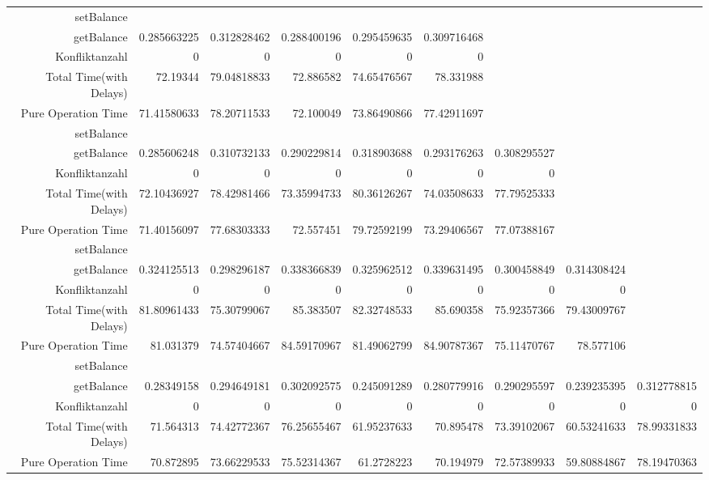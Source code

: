 \begin{landscape}
\begin{table}[htbp]
\begin{tabular}{rrrrrrrrr}
\cline{1-9}    
    setBalance &       &       &       &       &       &       &       &  \\
    getBalance & 0.285663225 & 0.312828462 & 0.288400196 & 0.295459635 & 0.309716468 &       &       &  \\
    Konfliktanzahl & 0     & 0     & 0     & 0     & 0     &       &       &  \\
    Total Time(with Delays) & 72.19344 & 79.04818833 & 72.886582 & 74.65476567 & 78.331988 &       &       &  \\
    Pure Operation Time & 71.41580633 & 78.20711533 & 72.100049 & 73.86490866 & 77.42911697 &       &       &  \\
\cline{1-9}    
    setBalance &       &       &       &       &       &       &       &  \\
    getBalance & 0.285606248 & 0.310732133 & 0.290229814 & 0.318903688 & 0.293176263 & 0.308295527 &       &  \\
    Konfliktanzahl & 0     & 0     & 0     & 0     & 0     & 0     &       &  \\
    Total Time(with Delays) & 72.10436927 & 78.42981466 & 73.35994733 & 80.36126267 & 74.03508633 & 77.79525333 &       &  \\
    Pure Operation Time & 71.40156097 & 77.68303333 & 72.557451 & 79.72592199 & 73.29406567 & 77.07388167 &       &  \\
\cline{1-9}    
    setBalance &       &       &       &       &       &       &       &  \\
    getBalance & 0.324125513 & 0.298296187 & 0.338366839 & 0.325962512 & 0.339631495 & 0.300458849 & 0.314308424 &  \\
    Konfliktanzahl & 0     & 0     & 0     & 0     & 0     & 0     & 0     &  \\
    Total Time(with Delays) & 81.80961433 & 75.30799067 & 85.383507 & 82.32748533 & 85.690358 & 75.92357366 & 79.43009767 &  \\
    Pure Operation Time & 81.031379 & 74.57404667 & 84.59170967 & 81.49062799 & 84.90787367 & 75.11470767 & 78.577106 &  \\
\cline{1-9}    
    setBalance &       &       &       &       &       &       &       &  \\
    getBalance & 0.28349158 & 0.294649181 & 0.302092575 & 0.245091289 & 0.280779916 & 0.290295597 & 0.239235395 & 0.312778815 \\
    Konfliktanzahl & 0     & 0     & 0     & 0     & 0     & 0     & 0     & 0 \\
    Total Time(with Delays) & 71.564313 & 74.42772367 & 76.25655467 & 61.95237633 & 70.895478 & 73.39102067 & 60.53241633 & 78.99331833 \\
    Pure Operation Time & 70.872895 & 73.66229533 & 75.52314367 & 61.2728223 & 70.194979 & 72.57389933 & 59.80884867 & 78.19470363 \\
    \bottomrule
    \end{tabular}%
  \label{tab:addlabel}%
\end{table}%
\end{landscape}


